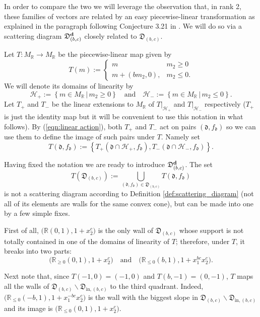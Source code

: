 \documentclass[11pt]{amsart}
\theoremstyle{remark}
\numberwithin{equation}{section}
\newcommand{\RR}{\mathbb{R}}
\newcommand{\fd}{\mathfrak{d}}
\newcommand{\fD}{\mathfrak{D}}
\newcommand{\bfd}{{\bf d}}
\begin{document}
In order to compare the two we will leverage the observation that, in rank 2,
these families of vectors are related by an easy piecewise-linear transformation
as explained in the paragraph following Conjecture 3.21 in \cite{RS}. We will do
so via a scattering diagram $\fD^{\bfd}_{(b,c)}$ closely related to
$\fD_{(b,c)}$.

Let $T:M_\RR\rightarrow M_\RR$ be the piecewise-linear map given by
\[
  T (m) := 
  \begin{cases}
    m   & m_2 \geq 0 \\
    m + (bm_2,0), & m_2 \leq 0.
  \end{cases}
\]
We will denote its domains of linearity by 
\[ 
  \mathcal{H}_{+} := 
  \left\{ m \in M_{\mathbb{R}}\, |\, m_2 \geq 0 \right\} 
  \quad
  \mbox{and}
  \quad
  \mathcal{H}_{-} := 
  \left\{ m \in M_{\mathbb{R}} \,|\, m_2 \leq 0 \right\}.
\]
Let $T_+$ and $T_-$ be the linear extensions to $M_\RR$ of $T|_{\mathcal{H}_+}$
and $T|_{\mathcal{H}_-}$ respectively ($T_+$ is just the identity map but it
will be convenient to use this notation in what follows). 
By (\ref{eqn:linear action}), both $T_+$ and $T_-$ act on pairs $(\fd,f_\fd)$ so
we can use them to define the image of such pairs under $T$. Namely set
\[
  T(\fd,f_\fd):=
  \left\{
    T_+\left(\fd\cap\mathcal{H}_+,f_\fd\right),
    T_-\left(\fd\cap\mathcal{H}_-,f_\fd\right)
  \right\}.
\]

Having fixed the notation we are ready to introduce $\fD_{(b,c)}^\bfd$.
The set
\[
  T(\fD_{(b,c)}):=
  \bigcup_{(\fd,f_\fd)\in \fD_{(b,c)}}
  T(\fd,f_\fd)
\]
is not a scattering diagram according to Definition 
\ref{def:scattering_diagram} (not all of its elements are walls for the same
convex cone), but can be made into one by a few simple fixes.

First of all, $\big( \RR (0,1), 1+x_2^c\big)$ is the only wall of $\fD_{(b,c)}$
whose support is not totally contained in one of the domains of linearity of
$T$; therefore, under $T$, it breaks into two parts:
\[
  \big( \RR_{\ge0} (0,1), 1+x_2^c\big)
  \quad
  \mbox{and}
  \quad
  \big( \RR_{\le 0} (b,1), 1+x_1^{bc}x_2^c\big).
\]

Next note that, since $T(-1,0)=(-1,0)$ and $T(b,-1)=(0,-1)$, $T$ maps all the
walls of $\fD_{(b,c)}\smallsetminus\fD_{\mathrm{in},(b,c)}$ to the third quadrant.
Indeed, $\big(\RR_{\leq0}(-b,1),1+x_1^{-bc}x_2^c\big)$ is the wall with the biggest slope in
$\fD_{(b,c)}\smallsetminus\fD_{\mathrm{in},(b,c)}$ and its image is $\big( \RR_{\le0} (0,1), 1+x_2^c\big)$.
\end{document}
